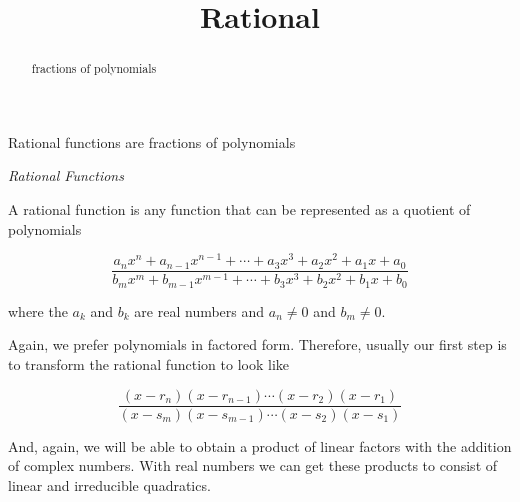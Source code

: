 \documentclass{ximera}
\title{Rational}
\begin{document}
\begin{abstract}
fractions of polynomials
\end{abstract}
\maketitle




Rational functions are fractions of polynomials


\begin{definition} \textit{Rational Functions}

A rational function is any function that can be represented as a quotient of polynomials 

\[   \frac{ a_n x^n + a_{n-1} x^{n-1} + \cdots + a_3 x^3 + a_2 x^2 + a_1 x + a_0  } { b_m x^m + b_{m-1} x^{m-1} + \cdots + b_3 x^3 + b_2 x^2 + b_1 x + b_0 }   \]



where the $a_k$ and $b_k$ are real numbers and $a_n \ne 0$ and $b_m \ne 0$.





\end{definition}




Again, we prefer polynomials in factored form.  Therefore, usually our first step is to transform the rational function to look like



\[   \frac{ (x-r_n)(x-r_{n-1})  \cdots (x-r_2)(x-r_1)  } { (x-s_m)(x-s_{m-1})  \cdots (x-s_2)(x-s_1) }   \]




And, again, we will be able to obtain a product of linear factors with the addition of complex numbers.  With real numbers we can get these products to consist of linear and irreducible quadratics.
\end{document}
